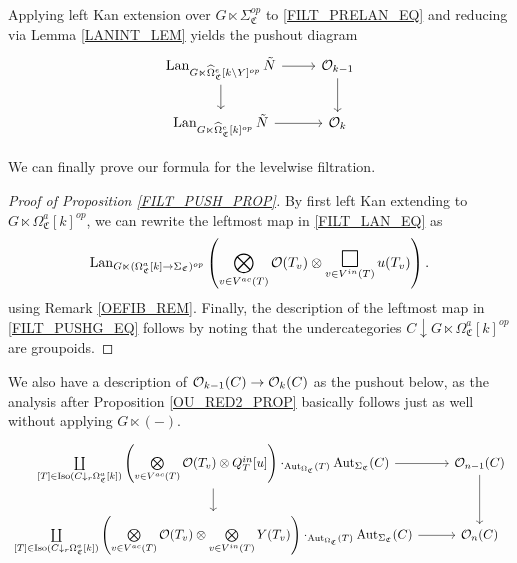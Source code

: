 \documentclass[a4paper,10pt
,draft
]{article}%
\renewcommand{\hat}{\widehat}
\renewcommand{\1}{\eta}%
\newcommand{\SC}{\Sigma_{\mathfrak C}}
\newcommand{\OC}{\Omega_{\mathfrak C}}
\begin{document}
Applying left Kan extension over $G \ltimes \SC^{op}$ to \eqref{FILT_PRELAN_EQ} and reducing via Lemma \ref{LANINT_LEM}
yields the pushout diagram
\begin{equation}
      \begin{tikzcd}
            \label{FILT_LAN_EQ}
            \Lan_{G \ltimes \hat\Omega_{\mathfrak C}^e[k \setminus Y]^{op}} \tilde N \arrow[r] \arrow[d]
            &
            \O_{k-1} \arrow[d]
            \\
            \Lan_{G \ltimes \hat\Omega_{\mathfrak C}^e[k]^{op}} \tilde N \arrow[r]
            &
            \O_k
      \end{tikzcd}
\end{equation}


We can finally prove our formula for the levelwise filtration.
\begin{proof}
      [Proof of Proposition \ref{FILT_PUSH_PROP}]
      By first left Kan extending to $G \ltimes \OC^a[k]^{op}$, we can rewrite the leftmost map in \eqref{FILT_LAN_EQ} as
      \begin{equation}
            \Lan_{G \ltimes (\OC^a[k] \to \SC)^{op}}\left(
                  \bigotimes_{v \in V^{ac}(T)}\O(T_v) \otimes
                  \mathop{\mathlarger{\mathlarger{\mathlarger{\square}}}}\limits_{v \in V^{in}(T)} u(T_v)
            \right).
      \end{equation}
      using Remark \ref{OEFIB_REM}.
      Finally, the description of the leftmost map in \eqref{FILT_PUSHG_EQ} follows by noting that
      the undercategories $C \downarrow G \ltimes \OC^a[k]^{op}$ are groupoids.
\end{proof}

\begin{remark}
      We also have a description of $\mathcal{O}_{k-1}(C) \to \mathcal{O}_k(C)$ as the pushout below,
      as the analysis after Proposition \ref{OU_RED2_PROP} basically follows just as well without applying $G \ltimes (-)$.
      \begin{equation}
            \label{FILT_PUSH_EQ}
            \begin{tikzcd}
                  \mathop{\coprod}\limits_{[T] \in \Iso(C \downarrow_r \Omega_{\mathfrak C}^a[k])}
                  \left(
                        \mathop{\bigotimes}\limits_{v \in V^{ac}(T)} \O(T_v) \otimes
                        Q^{in}_T[u]
                  \right) \cdot_{\Aut_{\OC} (T)} \Aut_{\SC}(C)
                  \arrow[r]
                  \arrow[d]
                  &
                  \O_{n-1}(C) \arrow[d]
                  \\                  
                  \mathop{\coprod}\limits_{[T] \in \Iso(C \downarrow_r \Omega_{\mathfrak C}^a[k])}
                  \left(
                        \mathop{\bigotimes}\limits_{v \in V^{ac}(T)} \O(T_v) \otimes
                        \mathop{\bigotimes}\limits_{v \in V^{in}(T)} Y(T_v)
                  \right) \cdot_{\Aut_{\OC}(T)} \Aut_{\SC}(C)
                  \arrow[r]
                  &
                  \O_n(C)
            \end{tikzcd}
      \end{equation}
\end{remark}
\end{document}
